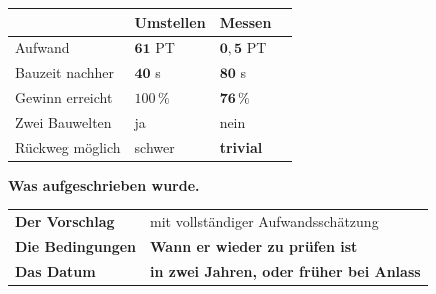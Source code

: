 \begin{merksatz}
\begin{center}
{\small
\renewcommand{\arraystretch}{1.45}
\begin{tabular}{@{}P{2.8cm}P{2.0cm}P{2.2cm}P{2.0cm}@{}}
\toprule
& \textbf{Umstellen} & \textbf{Messen} & \\
\midrule
Aufwand & $\mathbf{61}$ PT & \textcolor{gruen}{$\mathbf{0{,}5}$ PT} & \\
Bauzeit nachher & $\mathbf{40}$ s & $\mathbf{80}$ s & \\
Gewinn erreicht & $100\,\%$ & \textcolor{gruen}{$\mathbf{76\,\%}$} & \\
Zwei Bauwelten & \textcolor{akzent}{ja} & \textcolor{gruen}{nein} & \\
Rückweg möglich & \textcolor{akzent}{schwer} & \textcolor{gruen}{\textbf{trivial}} & \\
\bottomrule
\end{tabular}}
\end{center}

\begin{center}
\begin{minipage}{0.88\textwidth}
\end{minipage}
\end{center}

\textbf{Was aufgeschrieben wurde.}

\begin{center}
\renewcommand{\arraystretch}{1.5}
\begin{tabular}{@{}P{2.6cm}P{6.2cm}@{}}
\toprule
\textbf{Der Vorschlag} & mit vollständiger Aufwandsschätzung\\
\textbf{Die Bedingungen} & \textbf{Wann er wieder zu prüfen ist}\\
\textbf{Das Datum} & \textbf{in zwei Jahren, oder früher bei Anlass}\\
\bottomrule
\end{tabular}
\end{center}

\begin{center}
\end{center}
\end{merksatz}


